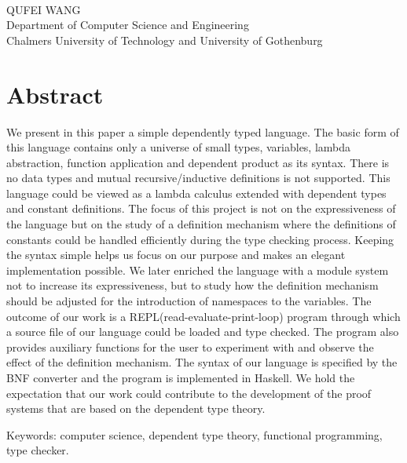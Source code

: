 \oneLineTitle\\
QUFEI WANG\\
Department of Computer Science and Engineering\\
Chalmers University of Technology and University of Gothenburg\setlength{\parskip}{0.5cm}

\thispagestyle{plain}			%
\setlength{\parskip}{0pt plus 1.0pt}
\section*{Abstract}
We present in this paper a simple dependently typed language. The basic form of this language contains only a universe of small types, variables, lambda abstraction, function application and dependent product as its syntax. There is no data types and mutual recursive/inductive definitions is not supported. This language could be viewed as a lambda calculus extended with dependent types and constant definitions. The focus of this project is not on the expressiveness of the language but on the study of a definition mechanism where the definitions of constants could be handled efficiently during the type checking process. Keeping the syntax simple helps us focus on our purpose and makes an elegant implementation possible. We later enriched the language with a module system not to increase its expressiveness, but to study how the definition mechanism should be adjusted for the introduction of namespaces to the variables. The outcome of our work is a REPL(read-evaluate-print-loop) program through which a source file of our language could be loaded and type checked. The program also provides auxiliary functions for the user to experiment with and observe the effect of the definition mechanism. The syntax of our language is specified by the BNF converter and the program is implemented in Haskell. We hold the expectation that our work could contribute to the development of the proof systems that are based on the dependent type theory.

\vfill
Keywords: computer science, dependent type theory, functional programming, type checker.

\newpage				%
\thispagestyle{empty}
\mbox{}